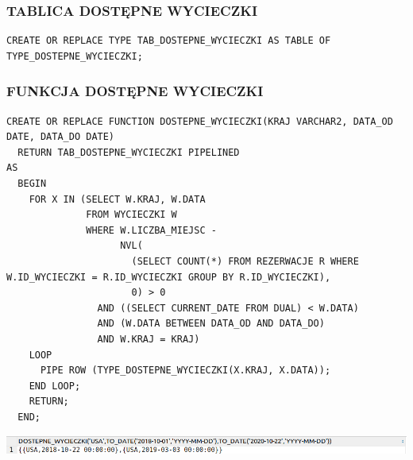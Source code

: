 \subsubsection{TABLICA DOSTĘPNE WYCIECZKI}
\begin{verbatim}
CREATE OR REPLACE TYPE TAB_DOSTEPNE_WYCIECZKI AS TABLE OF TYPE_DOSTEPNE_WYCIECZKI;
\end{verbatim}

\subsubsection{FUNKCJA DOSTĘPNE WYCIECZKI}
\begin{verbatim}
CREATE OR REPLACE FUNCTION DOSTEPNE_WYCIECZKI(KRAJ VARCHAR2, DATA_OD DATE, DATA_DO DATE)
  RETURN TAB_DOSTEPNE_WYCIECZKI PIPELINED
AS
  BEGIN
    FOR X IN (SELECT W.KRAJ, W.DATA
              FROM WYCIECZKI W
              WHERE W.LICZBA_MIEJSC -
                    NVL(
                      (SELECT COUNT(*) FROM REZERWACJE R WHERE W.ID_WYCIECZKI = R.ID_WYCIECZKI GROUP BY R.ID_WYCIECZKI),
                      0) > 0
                AND ((SELECT CURRENT_DATE FROM DUAL) < W.DATA)
                AND (W.DATA BETWEEN DATA_OD AND DATA_DO)
                AND W.KRAJ = KRAJ)
    LOOP
      PIPE ROW (TYPE_DOSTEPNE_WYCIECZKI(X.KRAJ, X.DATA));
    END LOOP;
    RETURN;
  END; 
\end{verbatim}

\includegraphics[width=\linewidth]{./images/dostepne_wycieczki_funkcja.png}